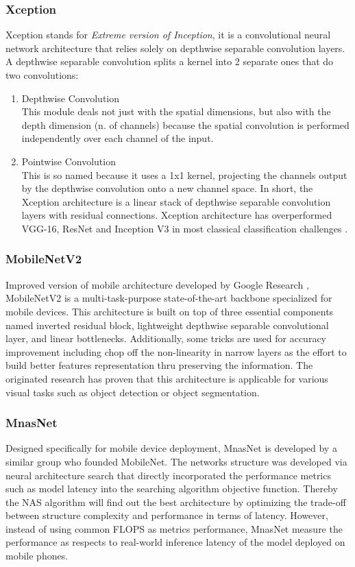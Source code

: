 \documentclass[conference]{IEEEtran}
\begin{document}
\subsubsection{Xception}%
Xception stands for \textit{Extreme version of Inception}, it is a convolutional neural network architecture that relies solely on depthwise separable convolution layers.
A depthwise separable convolution splits a kernel into 2 separate ones that do two convolutions: 
\begin{enumerate}
    \item Depthwise Convolution \\
    This module deals not just with the spatial dimensions, but also with the depth dimension (n. of channels) because the spatial convolution is performed independently over each channel of the input.
    \item Pointwise Convolution \\
    This is so named because it uses a 1x1 kernel, projecting the channels output by the depthwise convolution onto a new channel space. In short, the Xception architecture is a linear stack of depthwise separable convolution layers with residual connections. Xception architecture has overperformed VGG-16, ResNet and Inception V3 in most classical classification challenges \cite{xception}.
\end{enumerate}

\subsubsection{MobileNetV2} 
Improved version of mobile architecture developed by Google Research \cite{Sandler2018MobileNetV2IR}, MobileNetV2 is a multi-task-purpose state-of-the-art backbone specialized for mobile devices. This architecture is built on top of three essential components named inverted residual block, lightweight depthwise separable convolutional layer, and linear bottlenecks. Additionally, some tricks are used for accuracy improvement including chop off the non-linearity in narrow layers as the effort to build better features representation thru preserving the information. The originated research has proven that this architecture is applicable for various visual tasks such as object detection or object segmentation.  

\subsubsection{MnasNet}
Designed specifically for mobile device deployment, MnasNet\cite{Tan2019MnasNetPN} is developed by a similar group who founded MobileNet. The networks structure was developed via neural architecture search that directly incorporated the performance metrics such as model latency into the searching algorithm objective function. Thereby the NAS algorithm will find out the best architecture by optimizing the trade-off between structure complexity and performance in terms of latency. However, instead of using common FLOPS as metrics performance, MnasNet measure the performance as respects to real-world inference latency of the model deployed on mobile phones.
\end{document}
